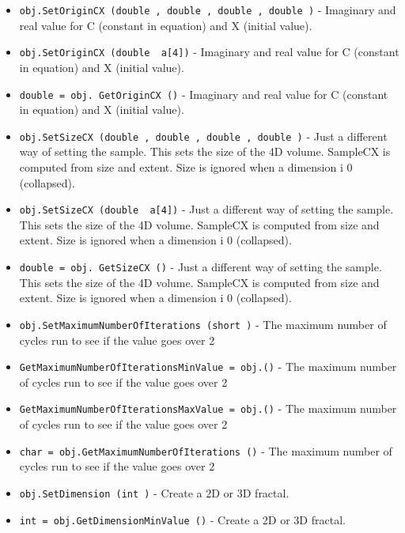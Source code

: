 \begin{itemize}
\item  \verb|obj.SetOriginCX (double , double , double , double )| -  Imaginary and real value for C (constant in equation) 
 and X (initial value).

\item  \verb|obj.SetOriginCX (double  a[4])| -  Imaginary and real value for C (constant in equation) 
 and X (initial value).

\item  \verb|double = obj. GetOriginCX ()| -  Imaginary and real value for C (constant in equation) 
 and X (initial value).

\item  \verb|obj.SetSizeCX (double , double , double , double )| -  Just a different way of setting the sample.  
 This sets the size of the 4D volume. 
 SampleCX is computed from size and extent.
 Size is ignored when a dimension i 0 (collapsed).

\item  \verb|obj.SetSizeCX (double  a[4])| -  Just a different way of setting the sample.  
 This sets the size of the 4D volume. 
 SampleCX is computed from size and extent.
 Size is ignored when a dimension i 0 (collapsed).

\item  \verb|double = obj. GetSizeCX ()| -  Just a different way of setting the sample.  
 This sets the size of the 4D volume. 
 SampleCX is computed from size and extent.
 Size is ignored when a dimension i 0 (collapsed).

\item  \verb|obj.SetMaximumNumberOfIterations (short )| -  The maximum number of cycles run to see if the value goes over 2

\item  \verb|GetMaximumNumberOfIterationsMinValue = obj.()| -  The maximum number of cycles run to see if the value goes over 2

\item  \verb|GetMaximumNumberOfIterationsMaxValue = obj.()| -  The maximum number of cycles run to see if the value goes over 2

\item  \verb|char = obj.GetMaximumNumberOfIterations ()| -  The maximum number of cycles run to see if the value goes over 2

\item  \verb|obj.SetDimension (int )| -  Create a 2D or 3D fractal.

\item  \verb|int = obj.GetDimensionMinValue ()| -  Create a 2D or 3D fractal.


\end{itemize}

